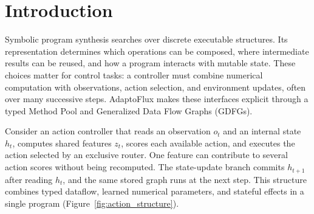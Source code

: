 \begin{abstract}
AdaptoFlux is a representation substrate for composing typed numerical operations and stateful actions in executable graphs. A metadata-driven Method Pool supplies typed interfaces, while a Generalized Data Flow Graph (GDFG) represents data reuse and per-step computation. External state connects successive graph executions. We make the execution contract explicit: a persistent program order and resource-based control dependencies determine conflicting state accesses while retaining parallelism between independent operations. The representation supports both discrete structure search and parameter optimization. In a controlled stateful synthesis experiment with identical operator implementations, fine-grained, role-merged, and flat type declarations achieve strict success in 29/30, 15/30, and 1/30 runs. A paired translation audit matches implicit and explicit state execution across 70,670 environment steps. Fixed-depth execution measurements cover up to 1,024 operation nodes and 2,176 edges. A shared-feature action controller supplies a concrete example: learned action scores feed an exclusive router, and its adapted GDFG matches a frozen controller for 20,480 steps. Further experiments examine operator-pool expansion and sustained execution in a continual-learning application. Together, these results characterize how typed composition, state ordering, and optimization interact in one executable representation.
\end{abstract}

\section{Introduction}
\label{sec:introduction}
Symbolic program synthesis searches over discrete executable structures. Its representation determines which operations can be composed, where intermediate results can be reused, and how a program interacts with mutable state. These choices matter for control tasks: a controller must combine numerical computation with observations, action selection, and environment updates, often over many successive steps. AdaptoFlux makes these interfaces explicit through a typed Method Pool and Generalized Data Flow Graphs (GDFGs).

Consider an action controller that reads an observation $o_t$ and an internal state $h_t$, computes shared features $z_t$, scores each available action, and executes the action selected by an exclusive router. One feature can contribute to several action scores without being recomputed. The state-update branch commits $h_{t+1}$ after reading $h_t$, and the same stored graph runs at the next step. This structure combines typed dataflow, learned numerical parameters, and stateful effects in a single program (Figure~\ref{fig:action_structure}).

